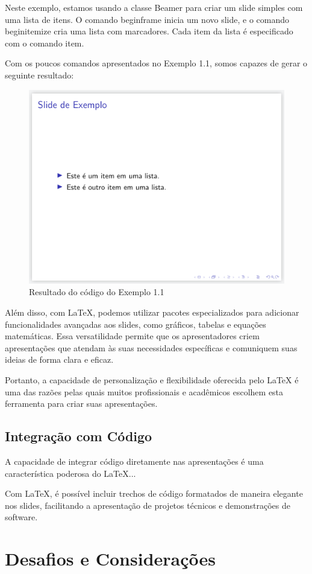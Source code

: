 Neste exemplo, estamos usando a classe Beamer para criar um slide simples com uma lista de itens. O comando begin{frame} inicia um novo slide, e o comando begin{itemize} cria uma lista com marcadores. Cada item da lista é especificado com o comando item.

Com os poucos comandos apresentados no Exemplo 1.1, somos capazes de gerar o seguinte resultado:
\begin{figure}[H]
    \centering
    \includegraphics[width=0.5\linewidth]{images/exemplo1.1.png}
    \caption{Resultado do código do Exemplo 1.1}
    \label{fig:enter-label}
\end{figure}


Além disso, com LaTeX, podemos utilizar pacotes especializados para adicionar funcionalidades avançadas aos slides, como gráficos, tabelas e equações matemáticas. Essa versatilidade permite que os apresentadores criem apresentações que atendam às suas necessidades específicas e comuniquem suas ideias de forma clara e eficaz.

Portanto, a capacidade de personalização e flexibilidade oferecida pelo LaTeX é uma das razões pelas quais muitos profissionais e acadêmicos escolhem esta ferramenta para criar suas apresentações.



\subsection{Integração com Código}
\label{subsec:integracao}

A capacidade de integrar código diretamente nas apresentações é uma característica poderosa do LaTeX...

\begin{remark}
    Com LaTeX, é possível incluir trechos de código formatados de maneira elegante nos slides, facilitando a apresentação de projetos técnicos e demonstrações de software.
\end{remark}

\section{Desafios e Considerações}
\label{sec:desafios}


